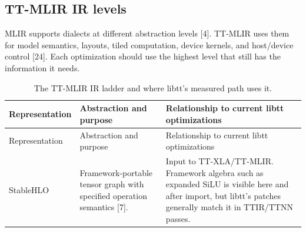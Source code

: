 \documentclass[
  10pt,
  american,
  10pt,
  letterpaper]{article}
\begin{document}
\hypertarget{tt-mlir-ir-levels}{%
\subsection{TT-MLIR IR levels}\label{tt-mlir-ir-levels}}

MLIR supports dialects at different abstraction levels {[}4{]}. TT-MLIR
uses them for model semantics, layouts, tiled computation, device
kernels, and host/device control {[}24{]}. Each optimization should use
the highest level that still has the information it needs.

\begin{longtable}[]{@{}lll@{}}
\caption{The TT-MLIR IR ladder and where libtt's measured path uses
it.}\tabularnewline
\toprule
\begin{minipage}[b]{0.30\columnwidth}\raggedright
Representation\strut
\end{minipage} & \begin{minipage}[b]{0.30\columnwidth}\raggedright
Abstraction and purpose\strut
\end{minipage} & \begin{minipage}[b]{0.30\columnwidth}\raggedright
Relationship to current libtt optimizations\strut
\end{minipage}\tabularnewline
\midrule
\endfirsthead
\toprule
\begin{minipage}[b]{0.30\columnwidth}\raggedright
Representation\strut
\end{minipage} & \begin{minipage}[b]{0.30\columnwidth}\raggedright
Abstraction and purpose\strut
\end{minipage} & \begin{minipage}[b]{0.30\columnwidth}\raggedright
Relationship to current libtt optimizations\strut
\end{minipage}\tabularnewline
\midrule
\endhead
\begin{minipage}[t]{0.30\columnwidth}\raggedright
StableHLO\strut
\end{minipage} & \begin{minipage}[t]{0.30\columnwidth}\raggedright
Framework-portable tensor graph with specified operation semantics
{[}7{]}.\strut
\end{minipage} & \begin{minipage}[t]{0.30\columnwidth}\raggedright
Input to TT-XLA/TT-MLIR. Framework algebra such as expanded SiLU is
visible here and after import, but libtt's patches generally match it in
TTIR/TTNN passes.\strut
\end{minipage}\tabularnewline

\end{longtable}
\end{document}
